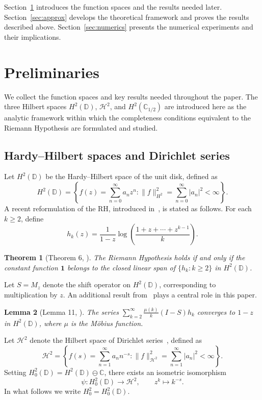\documentclass[11pt]{extarticle}
\numberwithin{equation}{section}
\theoremstyle{plain}
\newtheorem{theorem}{Theorem}[section]
\newtheorem{lemma}[theorem]{Lemma}
\theoremstyle{remark}
\begin{document}
Section~\ref{sec:prelim} introduces the function spaces and the results needed
later. Section~\ref{sec:approx} develops the theoretical framework and proves the
results described above. Section~\ref{sec:numerics} presents the numerical
experiments and their implications.

\section{Preliminaries}\label{sec:prelim}

We collect the function spaces and key results needed throughout the paper. The three Hilbert spaces $H^2(\mathbb{D})$, $\mathcal{H}^2$, and $H^2(\mathbb{C}_{1/2})$ are introduced here as the analytic framework within which the completeness conditions equivalent to the Riemann Hypothesis are formulated and studied.

\subsection{Hardy--Hilbert spaces and Dirichlet series}

Let $H^2(\mathbb{D})$ be the Hardy--Hilbert space of the unit disk, defined as
\[
H^2(\mathbb{D}) = \left\{ f(z) = \sum_{n=0}^{\infty} a_n z^n : \|f\|_{H^2}^2 = \sum_{n=0}^{\infty} |a_n|^2 < \infty \right\}.
\]
A recent reformulation of the RH, introduced in~\cite{waleed1}, is stated as follows. For each $k \geq 2$, define
\[
h_k(z) = \frac{1}{1-z} \log\!\left(\frac{1 + z + \cdots + z^{k-1}}{k}\right).
\]

\begin{theorem}[Theorem 6, \cite{waleed1}]
The Riemann Hypothesis holds if and only if the constant function $\mathbf{1}$ belongs to the closed linear span of $\{h_k : k \geq 2\}$ in $H^2(\mathbb{D})$.
\end{theorem}

Let $S = M_z$ denote the shift operator on $H^2(\mathbb{D})$, corresponding to multiplication by $z$. An additional result from~\cite{waleed1} plays a central role in this paper.

\begin{lemma}[Lemma 11, \cite{waleed1}]
\label{lem1:waleed}
The series $\sum_{k=2}^{\infty} \frac{\mu(k)}{k}(I - S)h_k$ converges to $1 - z$ in $H^2(\mathbb{D})$, where $\mu$ is the M\"{o}bius function.
\end{lemma}

Let $\mathcal{H}^2$ denote the Hilbert space of Dirichlet series~\cite{2}, defined as
\[
\mathcal{H}^2 = \left\{ f(s) = \sum_{n=1}^{\infty} a_n n^{-s} : \|f\|_{\mathcal{H}^2}^2 = \sum_{n=1}^{\infty} |a_n|^2 < \infty \right\}.
\]
Setting $H^2_0(\mathbb{D}) = H^2(\mathbb{D}) \ominus \mathbb{C}$, there exists an isometric isomorphism~\cite{2}
\[
\psi : H^2_0(\mathbb{D}) \longrightarrow \mathcal{H}^2, \qquad z^k \longmapsto k^{-s}.
\]
In what follows we write $H^2_0 = H^2_0(\mathbb{D})$.
\end{document}
